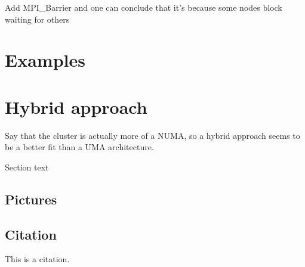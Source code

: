 \documentclass{article}
\begin{document}
Add MPI_Barrier and one can conclude that it's because some nodes block waiting
for others

\section{Examples}

\section{Hybrid approach}

Say that the cluster is actually more of a NUMA, so a hybrid approach seems
to be a better fit than a UMA architecture.

Section text

\subsection{Pictures}



\subsection{Citation}

This is a citation\cite{Eg}.

\newpage



% 

\end{document}
